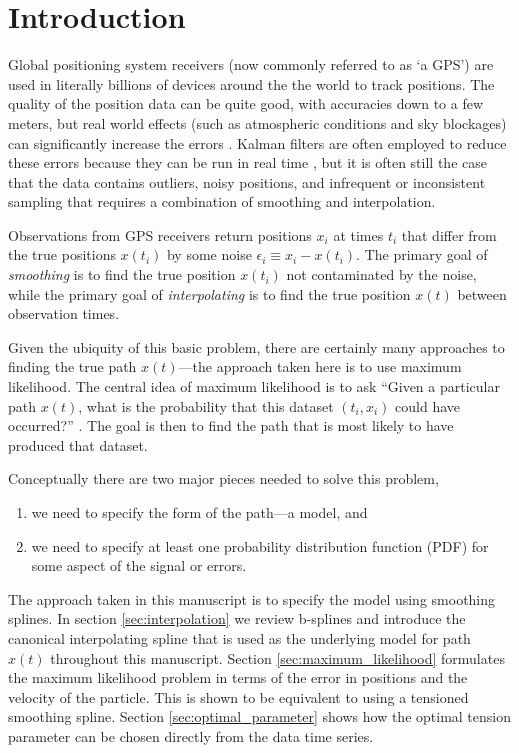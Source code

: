 \documentclass[10pt,journal]{IEEEtran}
\begin{document}

%
\section{Introduction}
%

Global positioning system receivers (now commonly referred to as `a GPS') are used in literally billions of devices around the the world to track positions. The quality of the position data can be quite good, with accuracies down to a few meters, but real world effects (such as atmospheric conditions and sky blockages) can significantly increase the errors \cite{faa2016-report}. Kalman filters are often employed to reduce these errors because they can be run in real time \cite{brown1997-book}, but it is often still the case that the data  contains outliers, noisy positions, and infrequent or inconsistent sampling that requires a combination of smoothing and interpolation.

Observations from GPS receivers return positions $x_i$ at times $t_i$ that differ from the true positions $x(t_i)$ by some noise $\epsilon_i \equiv x_i - x(t_i)$. The primary goal of \emph{smoothing} is to find the true position $x(t_i)$ not contaminated by the noise, while the primary goal of \emph{interpolating} is to find the true position $x(t)$ between observation times.

Given the ubiquity of this basic problem, there are certainly many approaches to finding the true path $x(t)$---the approach taken here is to use maximum likelihood. The central idea of maximum likelihood is to ask ``Given a particular path $x(t)$, what is the probability that this dataset $(t_i,x_i)$ could have occurred?'' \cite{press1992-book}. The goal is then to find the path that is most likely to have produced that dataset.

Conceptually there are two major pieces needed to solve this problem,
\begin{enumerate}
\item we need to specify the form of the path---a model, and
\item we need to specify at least one probability distribution function (PDF) for some aspect of the signal or errors.
\end{enumerate}

The approach taken in this manuscript is to specify the model using smoothing splines. In section \ref{sec:interpolation} we review b-splines and introduce the canonical interpolating spline that is used as the underlying model for path $x(t)$ throughout this manuscript. Section \ref{sec:maximum_likelihood} formulates the maximum likelihood problem in terms of the error in positions and the velocity of the particle. This is shown to be equivalent to using a tensioned smoothing spline. Section \ref{sec:optimal_parameter} shows how the optimal tension parameter can be chosen directly from the data time series.
\end{document}

